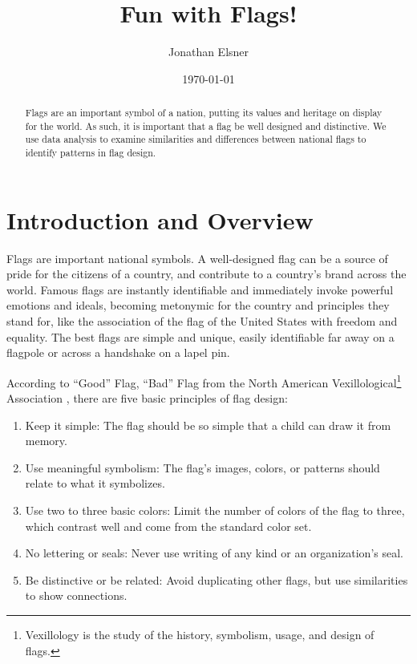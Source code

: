 \documentclass[11pt]{amsart}
\title{Fun with Flags!}
\author{Jonathan Elsner} %
\date{\today} %
\begin{document}
\begin{abstract}
    Flags are an important symbol of a nation, putting its values and heritage
    on display for the world. As such, it is important that a flag be well
    designed and distinctive. We use data analysis to examine similarities and
    differences between national flags to identify patterns in flag design.
\end{abstract}

\maketitle 

\section{Introduction and Overview}\label{sec:Introduction}

Flags are important national symbols. A well-designed flag can be a source of
pride for the citizens of a country, and contribute to a country's brand across
the world. Famous flags are instantly identifiable and immediately invoke
powerful emotions and ideals, becoming metonymic for the country and principles
they stand for, like the association of the flag of the United States with
freedom and equality. The best flags are simple and unique, easily identifiable
far away on a flagpole or across a handshake on a lapel pin.

According to ``Good'' Flag, ``Bad'' Flag from the North American
Vexillological\footnote{Vexillology is the study of the history, symbolism, usage,
and design of flags.} Association \cite{good-flag-bad-flag}, there are five
basic principles of flag design:
\begin{enumerate}
    \item Keep it simple: The flag should be so simple that a child can draw it
    from memory.
    \item Use meaningful symbolism: The flag's images, colors, or patterns
    should relate to what it symbolizes.
    \item Use two to three basic colors: Limit the number of colors of the flag
    to three, which contrast well and come from the standard color set.
    \item No lettering or seals: Never use writing of any kind or an
    organization's seal.
    \item Be distinctive or be related: Avoid duplicating other flags, but use
    similarities to show connections.
\end{enumerate}
\end{document}
